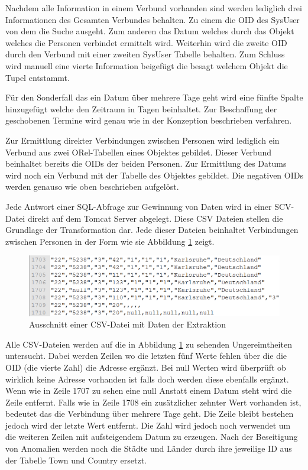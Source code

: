 Nachdem alle Information in einem Verbund vorhanden sind werden lediglich drei Informationen des Gesamten Verbundes behalten. Zu einem die OID des SysUser von dem die Suche ausgeht. Zum anderen das Datum welches durch das Objekt welches die Personen verbindet ermittelt wird. Weiterhin wird die zweite OID durch den Verbund mit einer zweiten SysUser Tabelle behalten. Zum Schluss wird manuell eine vierte Information beigefügt die besagt welchem Objekt die Tupel entstammt. 

Für den Sonderfall das ein Datum über mehrere Tage geht wird eine fünfte Spalte hinzugefügt welche den Zeitraum in Tagen beinhaltet. Zur Beschaffung der geschobenen Termine wird genau wie in der Konzeption beschrieben verfahren.

Zur Ermittlung direkter Verbindungen zwischen Personen wird lediglich ein Verbund aus zwei ORel-Tabellen eines Objektes gebildet. Dieser Verbund beinhaltet bereits die OIDs der beiden Personen. Zur Ermittlung des Datums wird noch ein Verbund mit der Tabelle des Objektes gebildet. Die negativen OIDs werden genauso wie oben beschrieben aufgelöst. 

Jede Antwort einer SQL-Abfrage zur Gewinnung von Daten wird in einer SCV-Datei direkt auf dem Tomcat Server abgelegt. Diese CSV Dateien stellen die Grundlage der Transformation dar. Jede dieser Dateien beinhaltet Verbindungen zwischen Personen in der Form wie sie Abbildung \ref{fig:umsetzung_csv_datei} zeigt. 

\begin{figure}[htbp]
\begin{center}
\includegraphics[width=1.0\textwidth]{pics/umsetzung_csv_datei.png}
\caption{Ausschnitt einer CSV-Datei mit Daten der Extraktion}
\label{fig:umsetzung_csv_datei}
\end{center}
\end{figure}

Alle CSV-Dateien werden auf die in Abbildung \ref{fig:umsetzung_csv_datei} zu sehenden Ungereimtheiten untersucht. Dabei werden Zeilen wo die letzten fünf Werte fehlen über die die OID (die vierte Zahl) die Adresse ergänzt. Bei null Werten wird überprüft ob wirklich keine Adresse vorhanden ist falls doch werden diese ebenfalls ergänzt. Wenn wie in Zeile 1707 zu sehen eine null Anstatt einem Datum steht wird die Zeile entfernt. Falls wie in Zeile 1708 ein zusätzlicher zehnter Wert vorhanden ist, bedeutet das die Verbindung über mehrere Tage geht. Die Zeile bleibt bestehen jedoch wird der letzte Wert entfernt. Die Zahl wird jedoch noch verwendet um die weiteren Zeilen mit aufsteigendem Datum zu erzeugen. Nach der Beseitigung von Anomalien werden noch die Städte und Länder durch ihre jeweilige ID aus der Tabelle Town und Country ersetzt.

